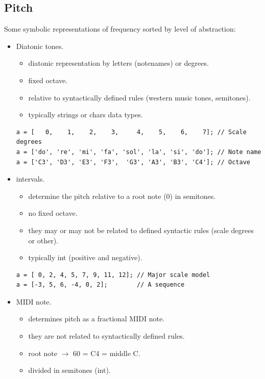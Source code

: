 \subsection{Pitch}\label{pitch}

Some symbolic representations of frequency sorted by level of abstraction:

\begin{itemize}
\tightlist
\item Diatonic tones.
  \begin{itemize}
  \tightlist
  \item diatonic representation by letters (notenames) or degrees.
  \item fixed octave.
  \item relative to syntactically defined rules (western music tones, semitones).
  \item typically strings or chars data types.
  \end{itemize}

\begin{lstlisting}[frame=single] 
a = [   0,    1,    2,    3,     4,    5,    6,    7]; // Scale degrees
a = ['do', 're', 'mi', 'fa', 'sol', 'la', 'si', 'do']; // Note name
a = ['C3', 'D3', 'E3', 'F3',  'G3', 'A3', 'B3', 'C4']; // Octave
\end{lstlisting}

\item intervals.

  \begin{itemize}
  \tightlist
  \item determine the pitch relative to a root note (0) in semitones.
  \item no fixed octave.
  \item they may or may not be related to defined syntactic rules (scale degrees or other).
  \item typically int (positive and negative).
  \end{itemize}

\begin{lstlisting}[frame=single] 
a = [ 0, 2, 4, 5, 7, 9, 11, 12]; // Major scale model
a = [-3, 5, 6, -4, 0, 2];        // A sequence 
\end{lstlisting}

\item MIDI note.
  \begin{itemize}
  \tightlist
  \item determines pitch as a fractional MIDI note.
  \item they are not related to syntactically defined rules.
  \item root note \(\rightarrow\) 60 = C4 = middle C.
  \item divided in semitones (int).
  \end{itemize}


\end{itemize}
